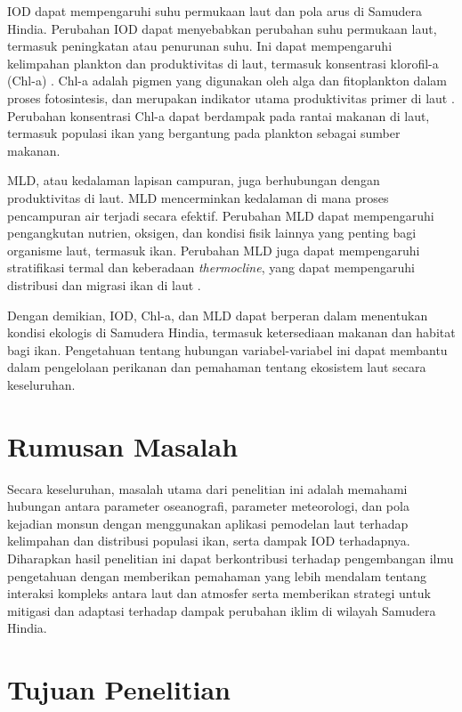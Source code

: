 \begin{spacing}{1.5}
	IOD dapat mempengaruhi suhu permukaan laut dan pola arus di Samudera Hindia. Perubahan IOD dapat menyebabkan perubahan suhu permukaan laut, termasuk peningkatan atau penurunan suhu. Ini dapat mempengaruhi kelimpahan plankton dan produktivitas di laut, termasuk konsentrasi klorofil-a (Chl-a) \cite{brewin2012influence}. Chl-a adalah pigmen yang digunakan oleh alga dan fitoplankton dalam proses fotosintesis, dan merupakan indikator utama produktivitas primer di laut \cite{huot2007does}. Perubahan konsentrasi Chl-a dapat berdampak pada rantai makanan di laut, termasuk populasi ikan yang bergantung pada plankton sebagai sumber makanan.
	
	MLD, atau kedalaman lapisan campuran, juga berhubungan dengan produktivitas di laut. MLD mencerminkan kedalaman di mana proses pencampuran air terjadi secara efektif. Perubahan MLD dapat mempengaruhi pengangkutan nutrien, oksigen, dan kondisi fisik lainnya yang penting bagi organisme laut, termasuk ikan. Perubahan MLD juga dapat mempengaruhi stratifikasi termal dan keberadaan \textit{thermocline}, yang dapat mempengaruhi distribusi dan migrasi ikan di laut \cite{bernal2017sharing}.
	
	Dengan demikian, IOD, Chl-a, dan MLD dapat berperan dalam menentukan kondisi ekologis di Samudera Hindia, termasuk ketersediaan makanan dan habitat bagi ikan. Pengetahuan tentang hubungan variabel-variabel ini dapat membantu dalam pengelolaan perikanan dan pemahaman tentang ekosistem laut secara keseluruhan.
	
	\section[Rumusan Masalah]{Rumusan Masalah}
	Secara keseluruhan, masalah utama dari penelitian ini adalah memahami hubungan antara parameter oseanografi, parameter meteorologi, dan pola kejadian monsun dengan menggunakan aplikasi pemodelan laut terhadap kelimpahan dan distribusi populasi ikan, serta dampak IOD terhadapnya. Diharapkan hasil penelitian ini dapat berkontribusi terhadap pengembangan ilmu pengetahuan dengan memberikan pemahaman yang lebih mendalam tentang interaksi kompleks antara laut dan atmosfer serta memberikan strategi untuk mitigasi dan adaptasi terhadap dampak perubahan iklim di wilayah Samudera Hindia.

	\section[Tujuan Penelitian]{Tujuan Penelitian}
	

\end{spacing}
